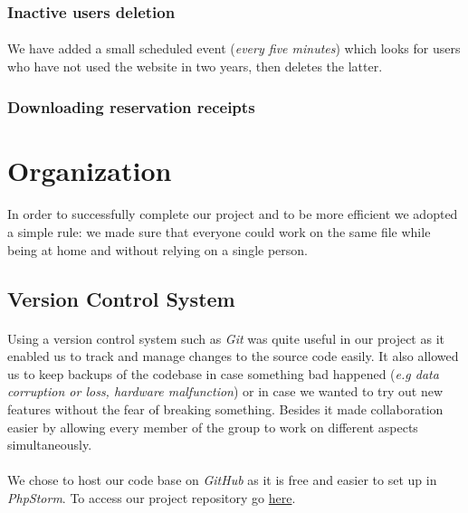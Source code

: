 \documentclass[11pt,a4paper,titlepage]{article}
\begin{document}
\subsubsection{Inactive users deletion}
\paragraph{}
We have added a small scheduled event (\textit{every five minutes}) which looks for users who have not used the website in two years, then deletes the latter.

\subsubsection{Downloading reservation receipts}

\section{Organization}
\paragraph{} 
In order to successfully complete our project and to be more efficient we adopted a simple rule: we made sure that everyone could work on the same file while being at home and without relying on a single person.

\subsection{Version Control System}
\paragraph{}
Using a version control system such as \textit{Git} was quite useful in our project as it enabled us to track and manage changes to the source code easily. It also allowed us to keep backups of the codebase in case something bad happened (\textit{e.g data corruption or loss, hardware malfunction}) or in case we wanted to try out new features without the fear of breaking something. Besides it made collaboration easier by allowing every member of the group to work on different aspects simultaneously.
\paragraph{}
We chose to host our code base on \textit{GitHub} as it is free and easier to set up in \textit{PhpStorm}. To access our project repository go \href{https://github.com/TheRefraction/Martine-travels}{here}.
\end{document}
